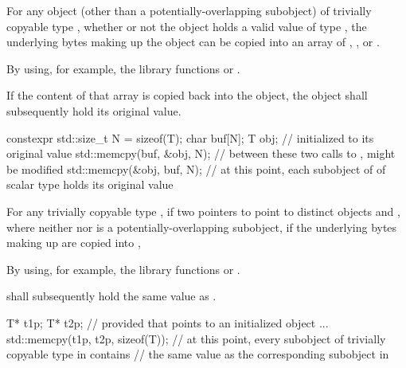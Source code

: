 \pnum
{}%
%
For any object (other than a potentially-overlapping subobject) of trivially copyable type
, whether or not the object holds a valid value of type
, the underlying bytes making up the
object can be copied into an array of
,
, or
.
\begin{footnote}
By using, for example, the library
functions  or .
\end{footnote}
If the content of that array
is copied back into the object, the object shall
subsequently hold its original value.
\begin{example}
\begin{codeblock}
constexpr std::size_t N = sizeof(T);
char buf[N];
T obj;                          //  initialized to its original value
std::memcpy(buf, &obj, N);      // between these two calls to ,  might be modified
std::memcpy(&obj, buf, N);      // at this point, each subobject of  of scalar type holds its original value
\end{codeblock}
\end{example}

\pnum
For any trivially copyable type , if two pointers to  point to
distinct  objects  and , where neither
 nor  is a potentially-overlapping subobject, if the underlying
bytes making up
 are copied into ,
\begin{footnote}
By using, for example,
the library functions  or .
\end{footnote}
  shall subsequently hold the same value as
.
\begin{example}
\begin{codeblock}
T* t1p;
T* t2p;
    // provided that  points to an initialized object ...
std::memcpy(t1p, t2p, sizeof(T));
    // at this point, every subobject of trivially copyable type in  contains
    // the same value as the corresponding subobject in 
\end{codeblock}
\end{example}

